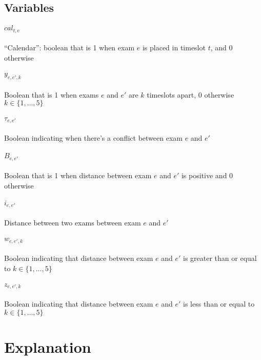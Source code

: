 \documentclass[11pt, a4paper, leqno]{article}
\begin{document}
	\subsection{Variables}
	
	\paragraph{$cal_{t,e}$} ``Calendar'': boolean that is 1 when exam $e$ is placed in timeslot $t$, and 0 otherwise
	
	\paragraph{$y_{e,e',k}$} Boolean that is 1 when exams $e$ and $e'$ are $k$ timeslots apart, 0 otherwise $k \in \{1,\dots,5\}$
	
	\paragraph{$\tau_{e,e'}$} Boolean indicating when there's a conflict between exam $e$ and $e'$
	
	\paragraph{$B_{e,e'}$} Boolean that is 1 when distance between exam $e$ and $e'$ is positive and 0 otherwise
	
	\paragraph{$i_{e,e'}$} Distance between two exams between exam $e$ and $e'$
	
	\paragraph{$w_{e,e',k}$} Boolean indicating that distance between exam $e$ and $e'$ is greater than or equal to \mbox{$k \in \{1,\dots,5\}$}
	
	\paragraph{$z_{e,e',k}$} Boolean indicating that distance between exam $e$ and $e'$ is less than or equal to $k \in \{1,\dots,5\}$
	
	
	\section{Explanation}
	
\end{document}

